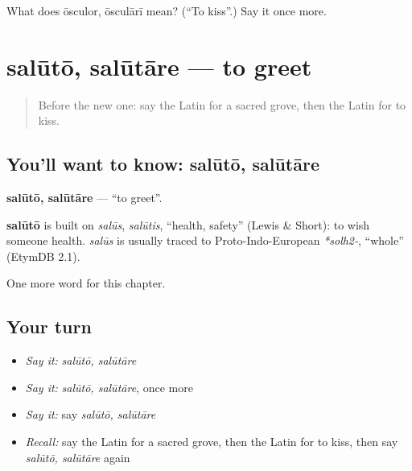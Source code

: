 \begin{tcolorbox}[breakable,colback=teal!4,colframe=teal!35!black,title={Before you move on}]
What does ōsculor, ōsculārī mean? (\textquotedblleft{}To kiss\textquotedblright{}.) Say it once more.
\end{tcolorbox}
\section[salūtō, salūtāre]{salūtō, salūtāre — to greet}

\label{lesson:LA-C197-saluto}



\begin{quote}
Before the new one: say the Latin for a sacred grove, then the Latin for to kiss.
\end{quote}

\subsection*{You'll want to know: salūtō, salūtāre}
\textbf{salūtō, salūtāre} — \textquotedblleft{}to greet\textquotedblright{}.

\begin{cousinweb}
\textbf{salūtō} is built on \emph{salūs}, \emph{salūtis}, \textquotedblleft{}health, safety\textquotedblright{} (Lewis \& Short): to wish someone health. \emph{salūs} is usually traced to Proto-Indo-European \emph{*solh2-}, \textquotedblleft{}whole\textquotedblright{} (EtymDB 2.1).
\end{cousinweb}

\begin{grammarlens}[title={What you've built}]
One more word for this chapter.
\end{grammarlens}

\subsection*{Your turn}
\begin{itemize}
\raggedright
  \item \emph{Say it:} \emph{salūtō, salūtāre}
  \item \emph{Say it:} \emph{salūtō, salūtāre}, once more
  \item \emph{Say it:} say \emph{salūtō, salūtāre}
  \item \emph{Recall:} say the Latin for a sacred grove, then the Latin for to kiss, then say \emph{salūtō, salūtāre} again
\end{itemize}

